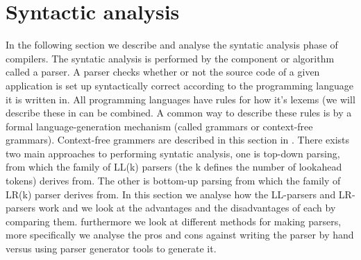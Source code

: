 \section{Syntactic analysis}

In the following section we describe and analyse the syntatic analysis phase of compilers. The syntatic analysis is performed by the component or algorithm called a parser. A parser checks whether or not the source code of a given application is set up syntactically correct according to the programming language it is written in. All programming languages have rules for how it's lexems (we will describe these in  can be combined. A common way to describe these rules is by a formal language-generation mechanism (called grammars or context-free grammars). Context-free grammers are described in this section in . There exists two main approaches to performing syntatic analysis, one is top-down parsing, from which the family of LL(k) parsers (the k defines the number of lookahead tokens) derives from. The other is bottom-up parsing from which the family of LR(k) parser derives from. In this section we analyse how the LL-parsers and LR-parsers work and we look at the advantages
and the disadvantages of each by comparing them. furthermore we look at different methods for making parsers, more specifically we analyse the pros and cons against writing the parser by hand versus using parser generator tools to generate it.





